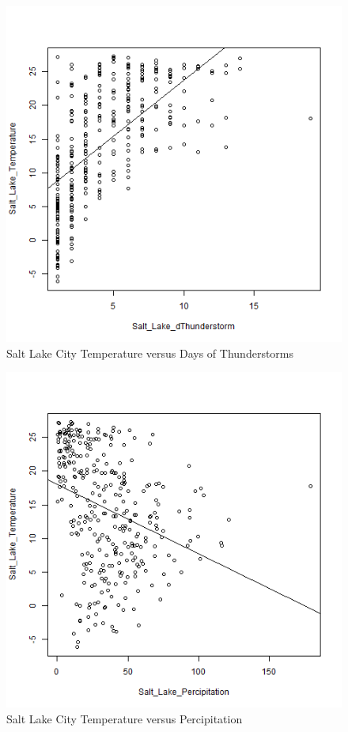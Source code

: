 \documentclass[final]{siamart1116}
\begin{document}
\begin{figure}
  \centering
  \includegraphics[width=15cm]{../data/img/Temp_vs_dThunderstorm.PNG}
  \caption{Salt Lake City Temperature versus Days of Thunderstorms}
  \label{fig:temp_vs_dthunderstorms}
\end{figure}

\begin{figure}
  \centering
  \includegraphics[width=15cm]{../data/img/Temp_vs_Percipitation.PNG}
  \caption{Salt Lake City Temperature versus Percipitation}
  \label{fig:temp_vs_percipitation}
\end{figure}




\end{document}
